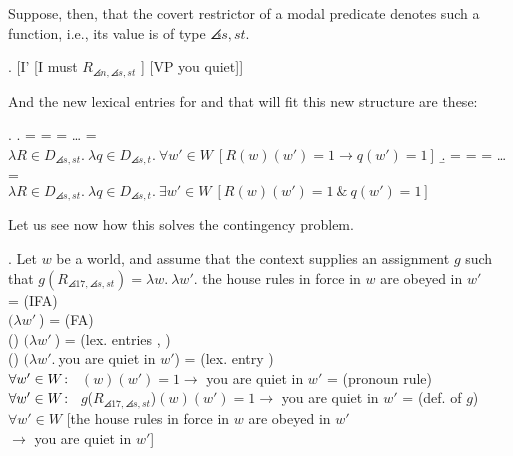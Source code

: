 Suppose, then, that the covert restrictor of a modal predicate denotes
such a function, i.e., its value is of type $\angles{s,st}$.

\exi. \label{newnewlf} [I' [I must $R_{\angles{n,\angles{s,st}}}$ ] [VP you quiet]]

And the new lexical entries for  and 
that will fit this new structure are these:

\ex. \a.  =  =  = \dots{} =\\
$\lambda R\in D_{\angles{s,st}}.\ \lambda q\in D_{\angles{s,t}}.\ \forall w'\in W\ [R(w)(w') =1 \rightarrow q(w')=1]$
\b.  =  =  = \dots{} =\\
$\lambda R\in D_{\angles{s,st}}.\ \lambda q\in D_{\angles{s,t}}.\ \exists w'\in W\ [R(w)(w')=1\ \&\ q(w')=1]$

Let us see now how this solves the contingency problem.

\ex. Let $w$ be a world, and assume that the context supplies an assignment $g$ such that $g(R_{\angles{17,\angles{s,st}}}) = \lambda w.\ \lambda w'.$ the house rules in force in $w$ are obeyed in $w'$\\[9pt]
 = \hfill{\tiny (IFA)}\\
$(\lambda w'\ $) = \hfill{\tiny (FA)}\\
 () $(\lambda w'\ $) = \hfill{\tiny (lex. entries , )}\\
 () $(\lambda w'.\ $you are quiet in $w'$) = \hfill{\tiny (lex. entry )}\\
$\forall w'\in W\colon\thinspace$ $(w)(w') =1 \rightarrow $ you are quiet in $w'$ = \hfill{\tiny (pronoun rule)}\\
$\forall w'\in W\colon\thinspace$ $g$({$R_{\angles{17,\angles{s,st}}}$})$(w)(w') =1 \rightarrow $ you are quiet in $w'$ = \hfill{\tiny (def. of $g$)}\\
$\forall w'\in W$ [the house rules in force in $w$ are obeyed in $w'$ \\
\null\hfill $\rightarrow$ you are quiet in $w'$]

